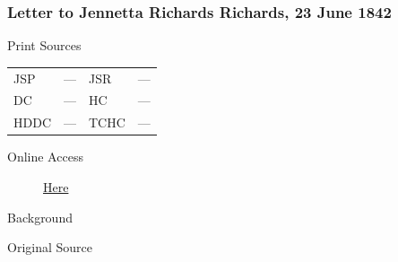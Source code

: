 		\subsubsection{Letter to Jennetta Richards Richards, 23 June 1842}
			\label{EMS-1842-JS-23-JUN-1842}
			
			\begin{description}
				\item[Print Sources]
			\end{description}

			\begin{tabular}{p{0.5in}p{1in}p{0.5in}p{1in}}
				JSP	 	& ---		& JSR 		& --- \\
				DC	 	& ---		& HC 		& --- \\
				HDDC 	& ---		& TCHC 		& --- \\
			\end{tabular}
			
			\begin{description}
				\item[Online Access] \href{https://www.josephsmithpapers.org/paper-summary/letter-to-jennetta-richards-richards-23-june-1842/1}{Here}
			\end{description}
			
			\begin{description}
				\item[Background]
			\end{description}
			
			
			\begin{description}
				\item[Original Source]
			\end{description}
			
			
